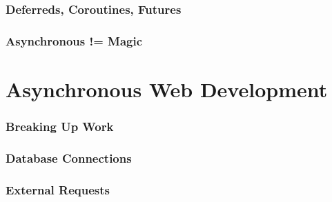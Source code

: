\documentclass{beamer}
\begin{document}
\begin{frame}
\frametitle{Deferreds, Coroutines, Futures}
\end{frame}


\begin{frame}
\frametitle{Asynchronous != Magic}
\end{frame}


\section{Asynchronous Web Development}
\begin{frame}
\frametitle{Breaking Up Work}
\end{frame}


\begin{frame}
\frametitle{Database Connections}
\end{frame}


\begin{frame}
\frametitle{External Requests}
\end{frame}
\end{document}
